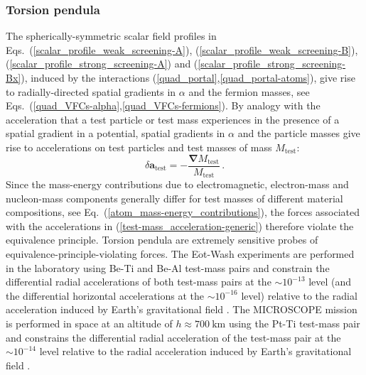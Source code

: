\documentclass[aps,prd,onecolumn,nofootinbib]{revtex4-2} %
\renewcommand{\v}[1]{\boldsymbol{#1}}		%
\begin{document}
\subsubsection{Torsion pendula}
\label{Sec:Main_TP}
The spherically-symmetric scalar field profiles in Eqs.~(\ref{scalar_profile_weak_screening-A}), (\ref{scalar_profile_weak_screening-B}), (\ref{scalar_profile_strong_screening-A}) and (\ref{scalar_profile_strong_screening-Bx}), induced by the interactions (\ref{quad_portal},\ref{quad_portal-atoms}), give rise to radially-directed spatial gradients in $\alpha$ and the fermion masses, see Eqs.~(\ref{quad_VFCs-alpha},\ref{quad_VFCs-fermions}). 
By analogy with the acceleration that a test particle or test mass experiences in the presence of a spatial gradient in a potential, spatial gradients in $\alpha$ and the particle masses give rise to accelerations on test particles and test masses of mass $M_\textrm{test}$: 
\begin{equation}
\label{test-mass_acceleration-generic}
\delta \v{a}_\textrm{test} = - \frac{\v{\nabla} M_\textrm{test}}{M_\textrm{test}}  \, . 
\end{equation}
Since the mass-energy contributions due to electromagnetic, electron-mass and nucleon-mass components generally differ for test masses of different material compositions, see Eq.~(\ref{atom_mass-energy_contributions}), the forces associated with the accelerations in (\ref{test-mass_acceleration-generic}) therefore violate the equivalence principle. 
Torsion pendula are extremely sensitive probes of equivalence-principle-violating forces. 
The E$\ddot{\textrm{o}}$t-Wash experiments are performed in the laboratory using Be-Ti and Be-Al test-mass pairs and constrain the differential radial accelerations of both test-mass pairs at the $\sim 10^{-13}$ level (and the differential horizontal accelerations at the $\sim 10^{-16}$ level) relative to the radial acceleration induced by Earth's gravitational field \cite{EotWash2008EP,EotWash2009EP}. 
The MICROSCOPE mission is performed in space at an altitude of $h \approx 700~\textrm{km}$ using the Pt-Ti test-mass pair and constrains the differential radial acceleration of the test-mass pair at the $\sim 10^{-14}$ level relative to the radial acceleration induced by Earth's gravitational field \cite{MICROSCOPE_2017EP}. 
\end{document}
